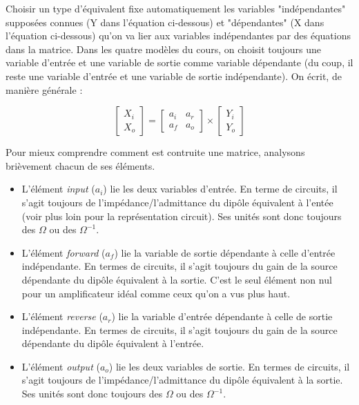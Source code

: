 Choisir un type d'équivalent fixe automatiquement les variables "indépendantes" supposées connues (Y dans l'équation ci-dessous) et "dépendantes" (X dans l'équation ci-dessous) qu'on va lier aux variables indépendantes par des équations dans la matrice. Dans les quatre modèles du cours, on choisit toujours une variable d'entrée et une variable de sortie comme variable dépendante (du coup, il reste une variable d'entrée et une variable de sortie indépendante). On écrit, de manière générale :

\begin{equation}
\left[ \begin{array}{c} X_i \\ X_o \end{array} \right] = \begin{bmatrix} a_i & a_r \\ a_f & a_o \end{bmatrix} \times \left[ \begin{array}{c} Y_i \\ Y_o \end{array} \right]
\end{equation}

\noindent Pour mieux comprendre comment est contruite une matrice, analysons brièvement chacun de ses éléments.
\begin{itemize}
\item L'élément \textit{input} ($a_i$) lie les deux variables d'entrée. En terme de circuits, il s'agit toujours de l'impédance/l'admittance du dipôle équivalent à l'entée (voir plus loin pour la représentation circuit). Ses unités sont donc toujours des $\Omega$ ou des $\Omega^{-1}$.
\item L'élément \textit{forward} ($a_f$) lie la variable de sortie dépendante à celle d'entrée indépendante. En termes de circuits, il s'agit toujours du gain de la source dépendante du dipôle équivalent à la sortie. C'est le seul élément non nul pour un amplificateur idéal comme ceux qu'on a vus plus haut.
\item L'élément \textit{reverse} ($a_r$) lie la variable d'entrée dépendante à celle de sortie indépendante. En termes de circuits, il s'agit toujours du gain de la source dépendante du dipôle équivalent à l'entrée.
\item L'élément \textit{output} ($a_o$) lie les deux variables de sortie. En termes de circuits, il s'agit toujours de l'impédance/l'admittance du dipôle équivalent à la sortie. Ses unités sont donc toujours des $\Omega$ ou des $\Omega^{-1}$.
\end{itemize}


